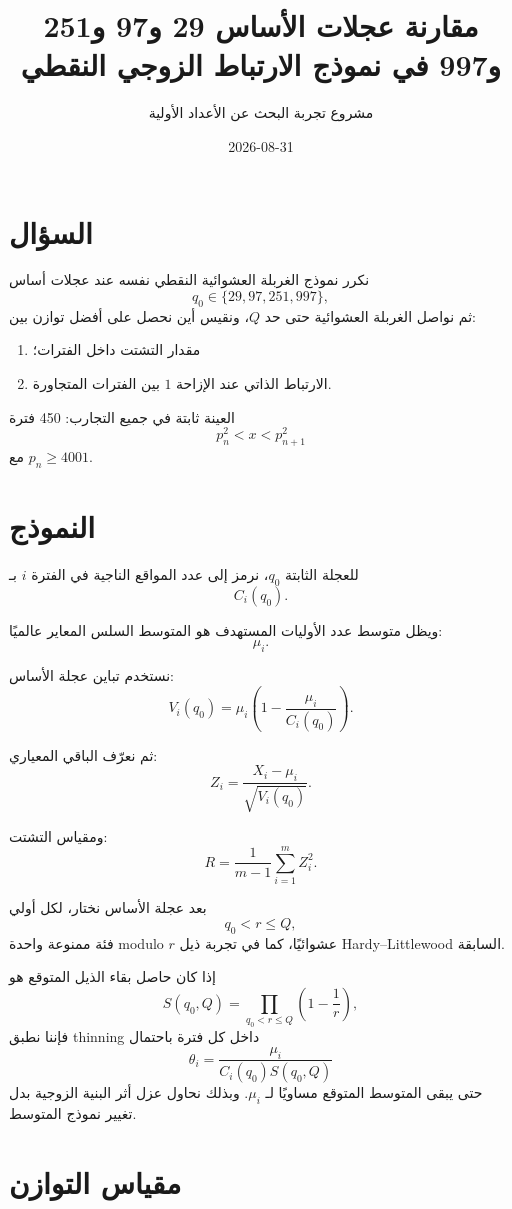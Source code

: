 \documentclass[12pt]{article}
\title{مقارنة عجلات الأساس 29 و97 و251 و997 في نموذج الارتباط الزوجي النقطي}
\author{مشروع تجربة البحث عن الأعداد الأولية}
\date{2026-08-31}
\begin{document}
\maketitle

\section{السؤال}

نكرر نموذج الغربلة العشوائية النقطي نفسه عند عجلات أساس
\[
q_0\in\{29,97,251,997\},
\]
ثم نواصل الغربلة العشوائية حتى حد \(Q\)، ونقيس أين نحصل على أفضل توازن بين:

\begin{enumerate}
\item مقدار التشتت داخل الفترات؛
\item الارتباط الذاتي عند الإزاحة \(1\) بين الفترات المتجاورة.
\end{enumerate}

العينة ثابتة في جميع التجارب: 450 فترة
\[
p_n^2 < x < p_{n+1}^2
\]
مع \(p_n\ge 4001\).

\section{النموذج}

للعجلة الثابتة \(q_0\)، نرمز إلى عدد المواقع الناجية في الفترة \(i\) بـ
\[
C_i(q_0).
\]

ويظل متوسط عدد الأوليات المستهدف هو المتوسط السلس المعاير عالميًا:
\[
\mu_i.
\]

نستخدم تباين عجلة الأساس:
\[
V_i(q_0)
=
\mu_i\left(1-\frac{\mu_i}{C_i(q_0)}\right).
\]

ثم نعرّف الباقي المعياري:
\[
Z_i
=
\frac{X_i-\mu_i}{\sqrt{V_i(q_0)}}.
\]

ومقياس التشتت:
\[
R
=
\frac{1}{m-1}\sum_{i=1}^{m} Z_i^2.
\]

بعد عجلة الأساس نختار، لكل أولي
\[
q_0<r\le Q,
\]
فئة ممنوعة واحدة modulo \(r\) عشوائيًا، كما في تجربة ذيل
Hardy--Littlewood السابقة.

إذا كان حاصل بقاء الذيل المتوقع هو
\[
S(q_0,Q)
=
\prod_{q_0<r\le Q}\left(1-\frac1r\right),
\]
فإننا نطبق thinning داخل كل فترة باحتمال
\[
\theta_i
=
\frac{\mu_i}{C_i(q_0)S(q_0,Q)}
\]
حتى يبقى المتوسط المتوقع مساويًا لـ \(\mu_i\).
وبذلك نحاول عزل أثر البنية الزوجية بدل تغيير نموذج المتوسط.

\section{مقياس التوازن}
\end{document}
